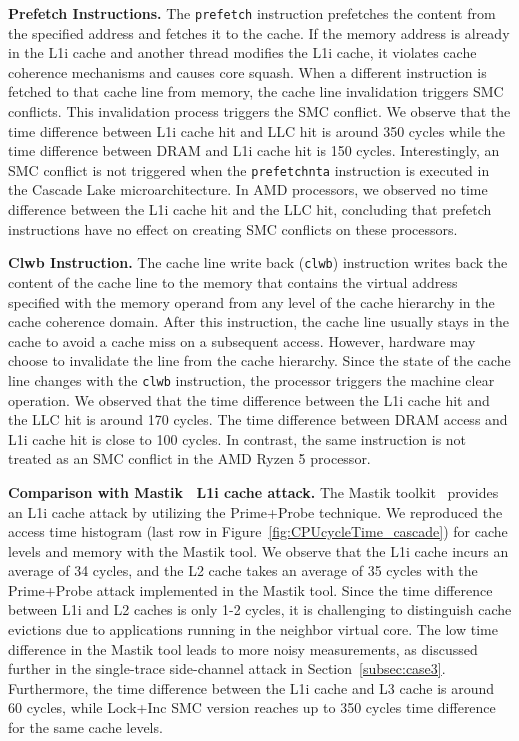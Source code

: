 \noindent\textbf{Prefetch Instructions.} The \texttt{prefetch} instruction prefetches the content from the specified address and fetches it to the cache. %
If the memory address is already in the L1i cache and another thread modifies the L1i cache, it violates cache coherence mechanisms and causes core squash.
%
When a different instruction is fetched to that cache line from memory, the cache line invalidation triggers SMC conflicts.
This invalidation process triggers the SMC conflict. We observe that the time difference between L1i cache hit and LLC hit is around 350 cycles while the time difference between DRAM and L1i cache hit is 150 cycles. Interestingly, an SMC conflict is not triggered when the \texttt{prefetchnta} instruction is executed in the Cascade Lake microarchitecture. 
In AMD processors, we observed no time difference between the L1i cache hit and the LLC hit, concluding that prefetch instructions have no effect on creating SMC conflicts on these processors.

\noindent\textbf{Clwb Instruction.} The cache line write back (\texttt{clwb}) instruction writes back the content of the cache line to the memory that contains the virtual address specified with the memory operand from any level of the cache hierarchy in the cache coherence domain. After this instruction, the cache line usually stays in the cache to avoid a cache miss on a subsequent access. However, hardware may choose to invalidate the line from the cache hierarchy. Since the state of the cache line changes with the \texttt{clwb} instruction, the processor triggers the machine clear operation. We observed that the time difference between the L1i cache hit and the LLC hit is around 170 cycles. The time difference between DRAM access and L1i cache hit is close to 100 cycles. 
In contrast, the same instruction is not treated as an SMC conflict in the AMD Ryzen 5 processor.

\noindent\textbf{Comparison with Mastik~\cite{yarom2016mastik} L1i cache attack.} The Mastik toolkit~\cite{yarom2016mastik} provides an L1i cache attack by utilizing the Prime+Probe technique. We reproduced the access time histogram (last row in Figure~\ref{fig:CPUcycleTime_cascade}) for cache levels and memory with the Mastik tool. We observe that the L1i cache incurs an average of 34 cycles, and the L2 cache takes an average of 35 cycles with the Prime+Probe attack implemented in the Mastik tool. Since the time difference between L1i and L2 caches is only 1-2 cycles, it is challenging to distinguish cache evictions due to applications running in the neighbor virtual core. The low time difference in the Mastik tool leads to more noisy measurements, as discussed further in the single-trace side-channel attack in Section~\ref{subsec:case3}. Furthermore, the time difference between the L1i cache and L3 cache is around 60 cycles, while Lock+Inc SMC version reaches up to 350 cycles time difference for the same cache levels.

